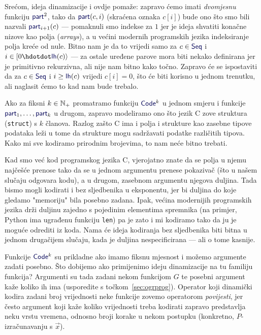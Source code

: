 Srećom, ideja dinamizacije i ovdje pomaže: zapravo ćemo imati \emph{dvomjesnu} funkciju $\f{part}^2$, tako da $\f{part}(c,i)$ (skraćena oznaka $c[i]$) bude ono što smo bili nazvali $\f{part}_{i+1}(c)$ --- pomaknuli smo indekse za $1$ jer je ideja shvatiti konačne nizove kao polja (\emph{arrays}), a u većini modernih programskih jezika indeksiranje polja kreće od nule. Bitno nam je da to vrijedi samo za $c\in\f{Seq}$ i $i\in[0\dd \f{lh}(c)\rangle$ --- za ostale uređene parove mora biti nekako definirana jer je primitivno rekurzivna, ali nije nam bitno kako točno. Zapravo će se ispostaviti da za $c\in\f{Seq}$ i $i\ge\f{lh}(c)$ vrijedi $c[i]=0$, što će biti korisno u jednom trenutku, ali naglasit ćemo to kad nam bude trebalo.

\begin{napomena}[{name=[strukture kao konačni nizovi fiksne duljine]}]
    Ako za fiksni $k\in{\mathbb N}_+$ promatramo funkciju $\f{Code}^k$ u jednom smjeru i funkcije $\f{part}_1,\dotsc,\f{part}_k$ u drugom, zapravo modeliramo ono što jezik C zove struktura (\texttt{struct}) s $k$ članova. Razlog zašto C ima i polja i strukture kao zasebne tipove podataka leži u tome da strukture mogu sadržavati podatke različitih tipova. Kako mi sve kodiramo prirodnim brojevima, to nam neće bitno trebati. %
\end{napomena}

Kad smo već kod programskog jezika C, vjerojatno znate da se polja u njemu najčešće prenose tako da se u jednom argumentu prenese pokazivač (što u našem slučaju odgovara kodu), a u drugom, zasebnom argumentu njegova duljina. Tada bismo mogli kodirati i bez sljedbenika u eksponentu, jer bi duljina do koje gledamo "memoriju" bila posebno zadana. Ipak, većina modernijih programskih jezika drži duljinu zajedno s pojedinim elementima spremnika (na primjer, Python ima ugrađenu funkciju \texttt{len}) pa je zato i mi kodiramo tako da ju je moguće odrediti iz koda. Nama će ideja kodiranja bez sljedbenika biti bitna u jednom drugačijem slučaju, kada je duljina nespecificirana --- ali o tome kasnije.

Funkcije $\f{Code}^k$ su prikladne ako imamo fiksnu mjesnost i možemo argumente zadati posebno. Što dobijemo ako primijenimo ideju dinamizacije na tu familiju funkcija? Argumenti su tada zadani nekom funkcijom $G$ te posebni argument kaže koliko ih ima (usporedite s točkom~\ref{sec:ogrprog}). Operator koji dinamički kodira zadani broj vrijednosti neke funkcije zovemo operatorom \emph{povijesti}, jer često argument koji kaže koliko vrijednosti treba kodirati zapravo predstavlja neku vrstu vremena, odnosno broji korake u nekom postupku (konkretno, $P$-izračunavanju s $\vec x$).

